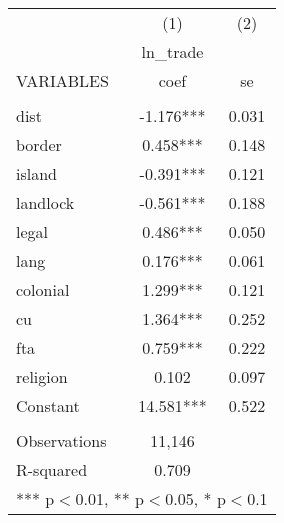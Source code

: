 \documentclass[]{article}
\begin{document}
\begin{tabular}{lcc} \hline
 & (1) & (2) \\
 & ln\_trade &  \\
VARIABLES & coef & se \\ \hline
 &  &  \\
dist & -1.176*** & 0.031 \\
border & 0.458*** & 0.148 \\
island & -0.391*** & 0.121 \\
landlock & -0.561*** & 0.188 \\
legal & 0.486*** & 0.050 \\
lang & 0.176*** & 0.061 \\
colonial & 1.299*** & 0.121 \\
cu & 1.364*** & 0.252 \\
fta & 0.759*** & 0.222 \\
religion & 0.102 & 0.097 \\
Constant & 14.581*** & 0.522 \\
 &  &  \\
Observations & 11,146 &  \\
 R-squared & 0.709 &  \\ \hline
\multicolumn{3}{c}{ *** p$<$0.01, ** p$<$0.05, * p$<$0.1} \\
\end{tabular}
\end{document}
